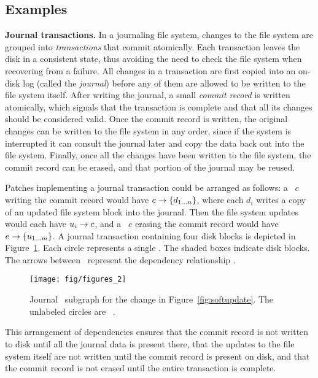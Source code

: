 \subsection{Examples}
\label{sec:patch:examples}

\textbf{Journal transactions.}
%
In a journaling file system, changes to the file system are grouped into
\emph{transactions} that commit atomically.
%
Each transaction leaves the disk in a consistent state, thus avoiding the need
to check the file system when recovering from a failure.
%
All changes in a transaction are first copied into an on-disk log (called the
\emph{journal}) before any of them are allowed to be written to the file
system itself.
%
After writing the journal, a small \emph{commit record} is written atomically,
which signals that the transaction is complete and that all its changes should
be considered valid.
%
Once the commit record is written, the original changes can be written to the
file system in any order, since if the system is interrupted it can consult
the journal later and copy the data back out into the file system.
%
Finally, once all the changes have been written to the file system, the commit
record can be erased, and that portion of the journal may be reused.

Patches implementing a journal transaction could be arranged as follows:
%
a \patch\ $c$ writing the commit record would have $c \rightarrow \{d_{1\dots n}\}$,
where each $d_i$ writes a copy of an updated file system block into the journal.
%
Then the file system updates would each have $u_i \rightarrow c$, and a \patch\ $e$
erasing the commit record would have $e \rightarrow \{u_{1\dots m}\}$.
%
A journal transaction containing four disk blocks is depicted in
Figure~\ref{fig:journal}.
%
Each circle represents a single \patch. The shaded boxes indicate disk blocks.
%
The arrows between \patches\ represent the dependency relationship \PDDepend.

\begin{figure}
  \centering
  \texttt{[image: fig/figures\_2]}
  \caption{\label{fig:journal} Journal \patch\ subgraph for the
    change in Figure~\ref{fig:softupdate}. The unlabeled circles are
    \noop\ \patches.}
\end{figure}

This arrangement of dependencies ensures that the commit record is not written
to disk until all the journal data is present there, that the updates to the
file system itself are not written until the commit record is present on disk,
and that the commit record is not erased until the entire transaction is
complete.


